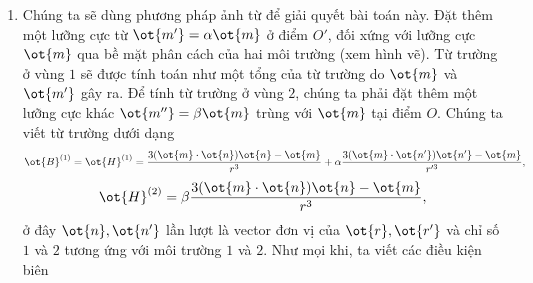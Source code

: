 \begin{loigiai}
    \begin{enumerate}[1)]
      \item Chúng ta sẽ dùng phương pháp ảnh từ để giải quyết bài toán này. Đặt thêm một lưỡng cực từ $\ot{m'}= \alpha \ot{m}$ ở điểm $O'$, đối xứng với lưỡng cực $\ot{m}$ qua bề mặt phân cách của hai môi trường (xem hình vẽ). Từ trường ở vùng $1$ sẽ được tính toán như một tổng của từ trường do $\ot{m}$ và $\ot{m'}$ gây ra. Để tính từ trường ở vùng $2$, chúng ta phải đặt thêm một lưỡng cực khác $\ot{m''}=\beta \ot{m}$ trùng với $\ot{m}$ tại điểm $O$. Chúng ta viết từ trường dưới dạng
  $$\ot{B}^{(1)} = \ot{H}^{(1)} = \frac{3(\ot{m}\cdot \ot{n})\ot{n} - \ot{m}}{r^3} +\alpha \frac{3(\ot{m}\cdot \ot{n'})\ot{n'} -\ot{m}}{r'^3},$$
    $$\ot{H}^{(2)} =\beta \frac{3(\ot{m}\cdot\ot{n})\ot{n} -\ot{m}}{r^3},$$
ở đây $\ot{n},\ot{n'}$ lần lượt là vector đơn vị của $\ot{r},\ot{r'}$ và chỉ số $1$ và $2$ tương ứng với môi trường $1$ và $2$. Như mọi khi, ta viết các điều kiện biên
  \begin{center}

\begin{tikzpicture}[x=0.75pt,y=0.75pt,yscale=-1,xscale=1]


\end{tikzpicture}
\end{center}
\end{enumerate}
\end{loigiai}
